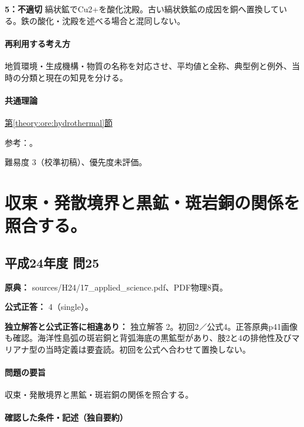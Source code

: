 \noindent\textbf{5：不適切} 縞状鉱でCu2+を酸化沈殿。古い縞状鉄鉱の成因を銅へ置換している。鉄の酸化・沈殿を述べる場合と混同しない。\par

\paragraph{再利用する考え方} 地質環境・生成機構・物質の名称を対応させ、平均値と全称、典型例と例外、当時の分類と現在の知見を分ける。

\paragraph{共通理論} \hyperref[theory:ore:hydrothermal]{第\ref*{theory:ore:hydrothermal}節}

\par 参考：\cite{ore50_porphyry_ref,ore50_magmatic_ref,ore50_besshi_ref}。

\par 難易度 3（校準初稿）、優先度未評価。

\section{収束・発散境界と黒鉱・斑岩銅の関係を照合する。}

\subsection{平成24年度 問25}
\label{q:h24-reg-applied-25}

\noindent\textbf{原典：} sources/H24/17\_applied\_science.pdf、PDF物理8頁。

\textbf{公式正答：} 4（single）。

\par\textbf{独立解答と公式正答に相違あり：} 独立解答 2。初回2／公式4。正答原典p41画像も確認。海洋性島弧の斑岩銅と背弧海底の黒鉱型があり、肢2と4の排他性及びマリアナ型の当時定義は要査読。初回を公式へ合わせて置換しない。

\paragraph{問題の要旨} 収束・発散境界と黒鉱・斑岩銅の関係を照合する。

\paragraph{確認した条件・記述（独自要約）}\mbox{}\par

